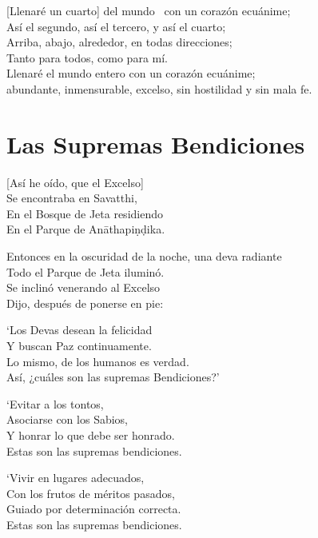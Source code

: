 [Llenaré un cuarto] del mundo \pause\ con un corazón ecuánime;\\
Así el segundo, así el tercero, y así el cuarto;\\
Arriba, abajo, alrededor, en todas direcciones;\\
Tanto para todos, como para mí.\\
Llenaré el mundo entero con un corazón ecuánime;\\ abundante, inmensurable, excelso, sin hostilidad y sin mala fe.


\clearpage

\chapter{Las Supremas Bendiciones}


\begin{leader}
\end{leader}

[Así he oído, que el Excelso]\\
Se encontraba en Savatthi,\\
En el Bosque de Jeta residiendo\\
En el Parque de Anāthapiṇḍika.

Entonces en la oscuridad de la noche, una deva radiante\\
Todo el Parque de Jeta iluminó.\\
Se inclinó venerando al Excelso\\
Dijo, después de ponerse en pie:

`Los Devas desean la felicidad\\
Y buscan Paz continuamente.\\
Lo mismo, de los humanos es verdad.\\
Así, ¿cuáles son las supremas Bendiciones?'

`Evitar a los tontos,\\
Asociarse con los Sabios,\\
Y honrar lo que debe ser honrado.\\
Estas son las supremas bendiciones.

`Vivir en lugares adecuados,\\
Con los frutos de méritos pasados,\\
Guiado por determinación correcta.\\
Estas son las supremas bendiciones.

